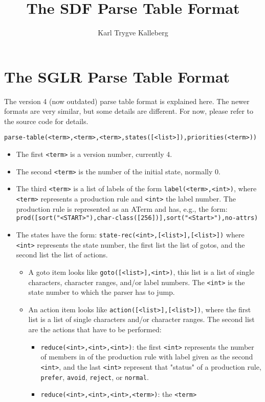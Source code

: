 \documentclass{article}
\title{The SDF Parse Table Format}
\author{Karl Trygve Kalleberg}
\newcommand{\code}[1]{\texttt{#1}}
\begin{document}
\section{The SGLR Parse Table Format}

	The version 4 (now outdated) parse table format is explained here. The newer
	formats are very similar, but some details are different. For now, please
	refer to the source code for details.

	\code{parse-table(<term>,<term>,<term>,states([<list>]),priorities(<term>))}

	\begin{itemize}
      \item The first \code{<term>} is a version number, currently 4.
      \item The second \code{<term>} is the number of the initial state,
      normally 0. 
      \item The third \code{<term>} is a list of labels of the form
      \code{label(<term>,<int>)}, where \code{<term>} represents a production
      rule and \code{<int>} the label number. The production rule is represented
      as an ATerm and has, e.g., the form:
      \code{prod([sort("<START>"),char-class([256])],sort("<Start>"),no-attrs)}
      \item The states have the form: \code{state-rec(<int>,[<list>],[<list>])}
      where \code{<int>} represents the state number, the first list the list of
      gotos, and the second list the list of actions.
	\begin{itemize} 
      \item A goto item looks like \code{goto([<list>],<int>)}, this list is a
      list of single characters, character ranges, and/or label numbers. The
      \code{<int>} is the state number to which the parser has to jump. 
      \item An action item looks like \code{action([<list>],[<list>])}, where
      the first list is a list of single characters and/or character ranges.
      The second list are the actions that have to be performed:
	\begin{itemize} 
      \item \code{reduce(<int>,<int>,<int>)}: the first \code{<int>} represents
      the number of members in of the production rule with label given as the
      second \code{<int>}, and the last \code{<int>} represent that "status" of
      a production rule, \code{prefer}, \code{avoid}, \code{reject}, or
      \code{normal}. 
      \item \code{reduce(<int>,<int>,<int>,<term>)}: the \code{<term>}

\end{itemize}
\end{itemize}
\end{itemize}
\end{document}
